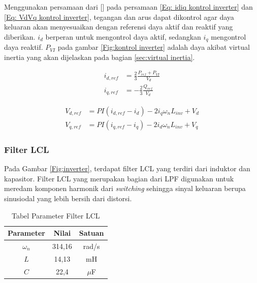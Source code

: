 Menggunakan persamaan dari [] pada persamaan \ref{Eq: idiq kontrol inverter} dan \ref{Eq: VdVq kontrol inverter}, tegangan dan arus dapat dikontrol agar daya keluaran akan menyesuaikan dengan referensi daya aktif dan reaktif yang diberikan. $\mathit{i_d}$ berperan untuk mengontrol daya aktif, sedangkan $\mathit{i_q}$ mengontrol daya reaktif. $\mathit{P_{VI}}$ pada gambar \ref{Fig:kontrol inverter} adalah daya akibat virtual inertia yang akan dijelaskan pada bagian \ref{sec:virtual inertia}.


\begin{equation}
\begin{aligned}
    i_{d,ref} &= \frac{2}{3} \frac{P_{ref}+P_{VI}}{V_d} \\
    i_{q,ref} &= -\frac{2}{3} \frac{Q_{ref}}{V_d}
\end{aligned}
\label{Eq: idiq kontrol inverter}
\end{equation}

\begin{equation}
\begin{aligned}
    V_{d,ref} &= PI(i_{d,ref}-i_d) - 2i_q\omega_nL_{inv} + V_d \\
    V_{q,ref} &= PI(i_{q,ref}-i_q) - 2i_d\omega_nL_{inv} + V_q
\end{aligned}
\label{Eq: VdVq kontrol inverter}
\end{equation}


\subsubsection{Filter LCL}

Pada Gambar \ref{Fig:inverter}, terdapat filter LCL yang terdiri dari induktor dan kapasitor. Filter LCL yang merupakan bagian dari LPF digunakan untuk meredam komponen harmonik dari \textit{switching} sehingga sinyal keluaran berupa sinusiodal yang lebih bersih dari distorsi.

\begin{table}[ht]
	\caption{Tabel Parameter Filter LCL}
	\vspace{0.5em}
	\centering
	\begin{tabular}{|c|c|c|}
		\hline
		Parameter & Nilai & Satuan \\
		\hline
		$\mathit{\omega_n}$ & 314,16 & rad/s \\
		$\mathit{L}$ & 14,13 & mH \\
		$\mathit{C}$ & 22,4 & $\mu$F \\
		\hline
	\end{tabular}
	\label{Tab: tabel filter lcl}
\end{table}



